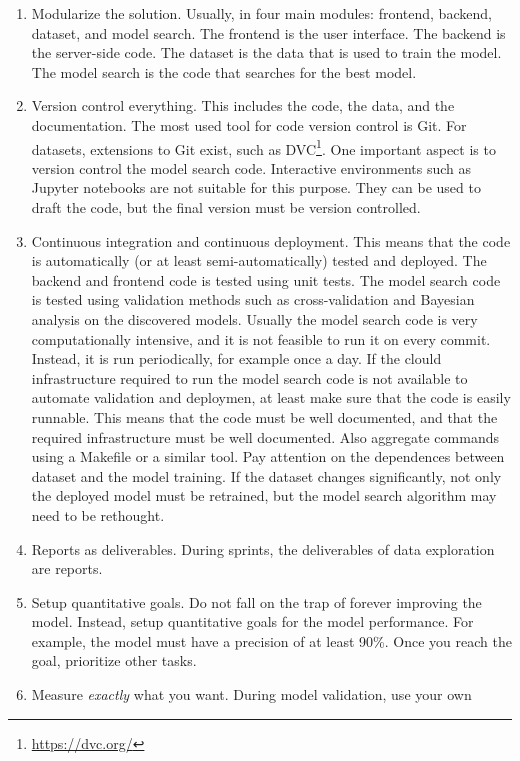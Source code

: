 \begin{enumerate}
  \item Modularize the solution. Usually, in four main modules: frontend, backend,
    dataset, and model search.  The frontend is the user interface.  The backend is the
    server-side code.  The dataset is the data that is used to train the model.  The model
    search is the code that searches for the best model.
  \item Version control everything.  This includes the code, the data, and the
    documentation. The most used tool for code version control is Git.  For datasets,
    extensions to Git exist, such as DVC\footnote{\url{https://dvc.org/}}.  One important aspect
    is to version control the model search code.  Interactive environments such as Jupyter
    notebooks are not suitable for this purpose.  They can be used to draft the code, but
    the final version must be version controlled.
  \item Continuous integration and continuous deployment.  This means that the code is
    automatically (or at least semi-automatically) tested and deployed.  The backend and
    frontend code is tested using unit tests.  The model search code is tested using
    validation methods such as cross-validation and Bayesian analysis on the discovered
    models.  Usually the model search code is very computationally intensive, and it is
    not feasible to run it on every commit.  Instead, it is run periodically, for example
    once a day.  If the clould infrastructure required to run the model search code is not
    available to automate validation and deploymen, at least make sure that the code is
    easily runnable.  This means that the code must be well documented, and that the
    required infrastructure must be well documented.  Also aggregate commands using a
    Makefile or a similar tool.  Pay attention on the dependences between dataset and the
    model training.  If the dataset changes significantly, not only the deployed model
    must be retrained, but the model search algorithm may need to be rethought.
  \item Reports as deliverables.  During sprints, the deliverables of data exploration are
    reports.
  \item Setup quantitative goals.  Do not fall on the trap of forever improving the model.
    Instead, setup quantitative goals for the model performance.  For example, the model
    must have a precision of at least 90\%.  Once you reach the goal, prioritize other
    tasks.
  \item Measure \emph{exactly} what you want.  During model validation, use your own

\end{enumerate}

